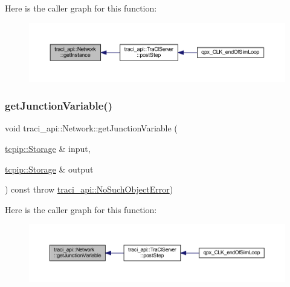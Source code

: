 Here is the caller graph for this function\+:\nopagebreak
\begin{figure}[H]
\begin{center}
\leavevmode
\includegraphics[width=350pt]{classtraci__api_1_1_network_ab6c12d9fa0affbeeb0d068544adb4724_icgraph}
\end{center}
\end{figure}
\mbox{\label{classtraci__api_1_1_network_a9bfe4236d1ab692d47133c69406811b3}} 
\subsubsection{\texorpdfstring{get\+Junction\+Variable()}{getJunctionVariable()}}
{\footnotesize\ttfamily void traci\+\_\+api\+::\+Network\+::get\+Junction\+Variable (\begin{DoxyParamCaption}\item[{\hyperlink{classtcpip_1_1_storage}{tcpip\+::\+Storage} \&}]{input,  }\item[{\hyperlink{classtcpip_1_1_storage}{tcpip\+::\+Storage} \&}]{output }\end{DoxyParamCaption}) const throw  \hyperlink{classtraci__api_1_1_no_such_object_error}{traci\+\_\+api\+::\+No\+Such\+Object\+Error}) }

Here is the caller graph for this function\+:\nopagebreak
\begin{figure}[H]
\begin{center}
\leavevmode
\includegraphics[width=350pt]{classtraci__api_1_1_network_a9bfe4236d1ab692d47133c69406811b3_icgraph}
\end{center}
\end{figure}
\mbox{\label{classtraci__api_1_1_network_a8a82aa15b0422ce28ca240e88c1af4f7}} 

